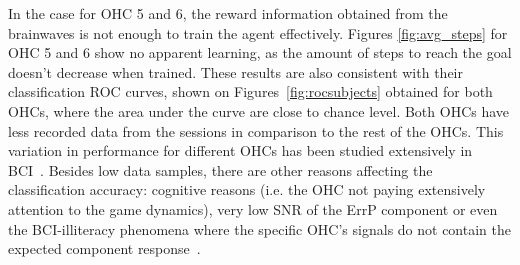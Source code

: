 \documentclass[journal]{IEEEtran}
\begin{document}
{{In the case for OHC 5 and 6, the reward information obtained from the brainwaves is not enough to train the agent effectively. Figures \ref{fig:avg_steps} for OHC 5 and 6 show no apparent learning, as the amount of steps to reach the goal doesn't decrease when trained.  These results are also consistent with their classification ROC curves, shown on Figures~\ref{fig:rocsubjects} obtained for both OHCs, where the area under the curve are close to chance level.  Both OHCs have less recorded data from the sessions in comparison to the rest of the OHCs.  This variation in performance for different OHCs has been studied extensively in BCI~\cite{Chavarriaga2014}.  Besides low data samples, there are other reasons affecting the classification accuracy:  cognitive reasons (i.e. the OHC not paying extensively attention to the game dynamics), very low SNR of the ErrP component or even the BCI-illiteracy phenomena where the specific OHC's signals do not contain the expected component response~\cite{Yousefi2019}.

}}
\end{document}
